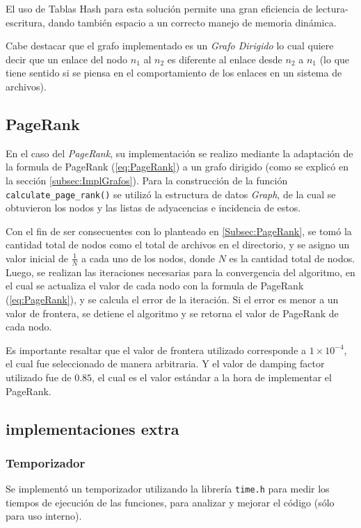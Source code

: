 El uso de Tablas Hash para esta solución permite una gran eficiencia de lectura-escritura, dando también espacio a un correcto manejo de memoria dinámica.

Cabe destacar que el grafo implementado es un \textit{Grafo Dirigido} lo cual quiere decir que un enlace del nodo $n_1$ al $n_2$ es diferente al enlace desde $n_2$ a $n_1$ (lo que tiene sentido si se piensa en el comportamiento de los enlaces en un sistema de archivos).

\subsection{PageRank}
En el caso del \textit{PageRank}, su implementación se realizo mediante la adaptación de la formula de PageRank (\ref{eq:PageRank}) a un grafo dirigido (como se explicó en la sección \ref{subsec:ImplGrafos}). Para la construcción de la función \texttt{calculate\_page\_rank()} se utilizó la estructura de datos \textit{Graph}, de la cual se obtuvieron los nodos y las listas de adyacencias e incidencia de estos.

Con el fin de ser consecuentes con lo planteado en \ref{Subsec:PageRank}, se tomó la cantidad total de nodos como el total de archivos en el directorio, y se asigno un valor inicial de $\frac{1}{N}$ a cada uno de los nodos, donde $N$ es la cantidad total de nodos. Luego, se realizan las iteraciones necesarias para la convergencia del algoritmo, en el cual se actualiza el valor de cada nodo con la formula de PageRank (\ref{eq:PageRank}), y se calcula el error de la iteración. Si el error es menor a un valor de frontera, se detiene el algoritmo y se retorna el valor de PageRank de cada nodo.

Es importante resaltar que el valor de frontera utilizado corresponde a $1 \times 10^{-4}$, el cual fue seleccionado de manera arbitraria. Y el valor de damping factor utilizado fue de $0.85$, el cual es el valor estándar a la hora de implementar el PageRank.

\subsection{implementaciones extra}
\subsubsection*{Temporizador}
Se implementó un temporizador utilizando la librería \texttt{time.h} para medir los tiempos de ejecución de las funciones, para analizar y mejorar el código (sólo para uso interno).

